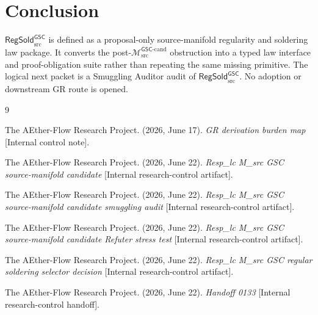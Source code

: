 \documentclass[11pt]{article}
\newcommand{\Mgsccand}{\mathcal{M}_{\mathrm{src}}^{\mathsf{GSC}\text{-}\mathrm{cand}}}
\newcommand{\RegSold}{\mathsf{RegSold}_{\mathrm{src}}^{\mathsf{GSC}}}
\begin{document}
\section{Conclusion}

\(\RegSold\) is defined as a proposal-only source-manifold regularity and
soldering law package. It converts the post-\(\Mgsccand\) obstruction into a
typed law interface and proof-obligation suite rather than repeating the same
missing primitive. The logical next packet is a Smuggling Auditor audit of
\(\RegSold\). No adoption or downstream GR route is opened.

\begin{thebibliography}{9}

The AEther-Flow Research Project. (2026, June 17). \emph{GR derivation
burden map} [Internal control note].

The AEther-Flow Research Project. (2026, June 22). \emph{Resp\_lc M\_src
GSC source-manifold candidate} [Internal research-control artifact].

The AEther-Flow Research Project. (2026, June 22). \emph{Resp\_lc M\_src
GSC source-manifold candidate smuggling audit}
[Internal research-control artifact].

The AEther-Flow Research Project. (2026, June 22). \emph{Resp\_lc M\_src
GSC source-manifold candidate Refuter stress test}
[Internal research-control artifact].

The AEther-Flow Research Project. (2026, June 22). \emph{Resp\_lc M\_src
GSC regular soldering selector decision}
[Internal research-control artifact].

The AEther-Flow Research Project. (2026, June 22). \emph{Handoff 0133}
[Internal research-control handoff].

\end{thebibliography}
\end{document}
